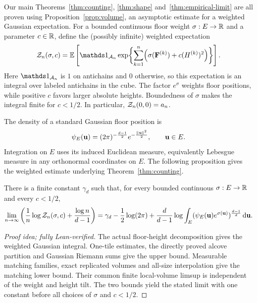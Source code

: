 \documentclass[11pt,letterpaper]{article}
\begin{document}
Our main Theorems~\ref{thm:counting}, \ref{thm:shape} and~\ref{thm:empirical-limit} are all proven using Proposition~\ref{prop:volume}, an asymptotic estimate for a weighted Gaussian expectation. For a bounded continuous floor weight $\sigma:E\to\mathbb R$ and a parameter $c\in\mathbb R$, define the (possibly infinite) weighted expectation
\begin{equation}\label{eq:def-zn}
      \cZ_n(\sigma,c) =\E\left[\ind_{\cA_n} \exp\biggl\{\sum_{k=1}^n\Bigl(\sigma(\vF^{(k)})+c(H^{(k)})^2\Bigr)\biggr\}\right].
\end{equation}
Here $\ind_{\cA_n}$ is $1$ on antichains and $0$ otherwise, so this expectation is an integral over labeled antichains in the cube. The factor $e^\sigma$ weights floor positions, while positive $c$ favors larger absolute heights. Boundedness of $\sigma$ makes the integral finite for $c<1/2$. In particular, $\mathcal Z_n(0,0)=a_n$.

The density of a standard Gaussian floor position is
\begin{equation}\label{eq:rho}
      \psi_E(\mathbf u) =(2\pi)^{-\frac{d-1}{2}}e^{-\frac{\|\mathbf u\|^2}{2}},\qquad \mathbf u\in E.
\end{equation}
Integration on $E$ uses its induced Euclidean measure, equivalently Lebesgue measure in any orthonormal coordinates on $E$. The following proposition gives the weighted estimate underlying Theorem~\ref{thm:counting}.


\begin{proposition}\label{prop:volume}\label{thm:volume}
      There is a finite constant $\gamma_d$ such that, for every bounded continuous $\sigma:E\to\mathbb R$ and every $c<1/2$,
      \begin{equation}\label{eq:weighted}
            \lim_{n\to\infty}\left(\frac1n\log\mathcal Z_n(\sigma,c)+\frac{\log n}{d-1}\right) =\gamma_d-\frac12\log(2\pi)+\frac d{d-1}\log\int_E(\psi_E(\mathbf u)e^{\sigma(\mathbf u)})^{\frac{d-1}d}\,\mathrm d\mathbf u.
      \end{equation}
\end{proposition}

\begin{proof}[Proof idea; fully Lean-verified]
The actual floor-height decomposition gives the weighted Gaussian integral. One-tile estimates, the directly proved alcove partition and Gaussian Riemann sums give the upper bound. Measurable matching families, exact replicated volumes and all-size interpolation give the matching lower bound. Their common finite local-volume limsup is independent of the weight and height tilt. The two bounds yield the stated limit with one constant before all choices of $\sigma$ and $c<1/2$.
\end{proof}
\end{document}
